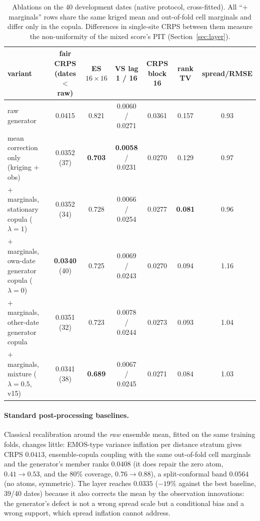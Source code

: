 \documentclass[11pt]{article}
\begin{document}
\begin{table}[t]
\centering\small
\begin{tabular}{lcccccc}
\toprule
variant & fair CRPS (dates $<$ raw) & ES $16{\times}16$ & VS lag 1 / 16 & CRPS block 16 & rank TV & spread/RMSE \\
\midrule
raw generator & 0.0415 & 0.821 & 0.0060 / 0.0271 & 0.0361 & 0.157 & 0.93 \\
mean correction only (kriging $+$ obs) & 0.0352 (37) & \textbf{0.703} & \textbf{0.0058} / 0.0231 & 0.0270 & 0.129 & 0.97 \\
$+$ marginals, stationary copula ($\lambda{=}1$) & 0.0352 (34) & 0.728 & 0.0066 / 0.0254 & 0.0277 & \textbf{0.081} & 0.96 \\
$+$ marginals, own-date generator copula ($\lambda{=}0$) & \textbf{0.0340} (40) & 0.725 & 0.0069 / 0.0243 & 0.0270 & 0.094 & 1.16 \\
$+$ marginals, other-date generator copula & 0.0351 (32) & 0.723 & 0.0078 / 0.0244 & 0.0273 & 0.093 & 1.04 \\
$+$ marginals, mixture ($\lambda{=}0.5$, v15) & 0.0341 (38) & \textbf{0.689} & 0.0067 / 0.0245 & 0.0271 & 0.084 & 1.03 \\
\bottomrule
\end{tabular}
\caption{Ablations on the 40 development dates (native protocol, cross-fitted). All ``$+$ marginals'' rows share the same kriged mean and out-of-fold cell marginals and differ only in the copula. Differences in single-site CRPS between them measure the non-uniformity of the mixed score's PIT (Section~\ref{sec:layer}).}
\label{tab:ablation}
\end{table}

\paragraph{Standard post-processing baselines.} Classical recalibration around the \emph{raw} ensemble mean, fitted on the same training folds, changes little: EMOS-type variance inflation per distance stratum gives CRPS $0.0413$, ensemble-copula coupling with the same out-of-fold cell marginals and the generator's member ranks $0.0408$ (it does repair the zero atom, $0.41\to0.53$, and the 80\% coverage, $0.76\to0.88$), a split-conformal band $0.0564$ (no atoms, symmetric). The layer reaches $0.0335$ ($-19\%$ against the best baseline, 39/40 dates) because it also corrects the mean by the observation innovations: the generator's defect is not a wrong spread scale but a conditional bias and a wrong support, which spread inflation cannot address.
\end{document}
